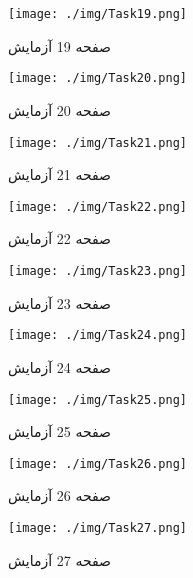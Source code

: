 {    %
    \begin{figure}[htpb]
        \centering
        \texttt{[image: ./img/Task19.png]}
        \caption{ صفحه 19 آزمایش }
        \label{fig:Task19}
    \end{figure}


    \begin{figure}[htpb]
        \centering
        \texttt{[image: ./img/Task20.png]}
        \caption{ صفحه 20 آزمایش }
        \label{fig:Task20}
    \end{figure}


    \begin{figure}[htpb]
        \centering
        \texttt{[image: ./img/Task21.png]}
        \caption{ صفحه 21 آزمایش }
        \label{fig:Task21}
    \end{figure}


    \begin{figure}[htpb]
        \centering
        \texttt{[image: ./img/Task22.png]}
        \caption{ صفحه 22 آزمایش }
        \label{fig:Task22}
    \end{figure}


    \begin{figure}[htpb]
        \centering
        \texttt{[image: ./img/Task23.png]}
        \caption{ صفحه 23 آزمایش }
        \label{fig:Task23}
    \end{figure}


    \begin{figure}[htpb]
        \centering
        \texttt{[image: ./img/Task24.png]}
        \caption{ صفحه 24 آزمایش }
        \label{fig:Task24}
    \end{figure}


    \begin{figure}[htpb]
        \centering
        \texttt{[image: ./img/Task25.png]}
        \caption{ صفحه 25 آزمایش }
        \label{fig:Task25}
    \end{figure}


    \begin{figure}[htpb]
        \centering
        \texttt{[image: ./img/Task26.png]}
        \caption{ صفحه 26 آزمایش }
        \label{fig:Task26}
    \end{figure}


    \begin{figure}[htpb]
        \centering
        \texttt{[image: ./img/Task27.png]}
        \caption{ صفحه 27 آزمایش }
        \label{fig:Task27}
    \end{figure}


}
